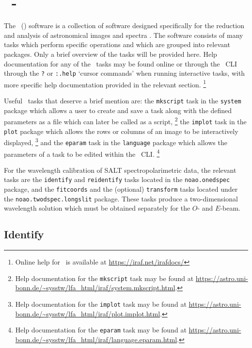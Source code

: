 \section[\textsc{iraf}]{\iraf\ - } \label{sec:iraf}

The \iraf\ () software is a collection of software designed specifically for the reduction and analysis of astronomical images and spectra \citep{iraf:1986, iraf:1993}. The software consists of many tasks which perform specific operations and which are grouped into relevant packages. Only a brief overview of the tasks will be provided here. Help documentation for any of the \iraf\ tasks may be found online or through the \iraf\ \gls{CLI} through the \texttt{?} or \texttt{:.help} `cursor commands' when running interactive tasks, with more specific help documentation provided in the relevant section.%
\footnote{Online help for \iraf\ is available at \url{https://iraf.net/irafdocs/}}

Useful \iraf\ tasks that deserve a brief mention are: the \texttt{mkscript} task in the \texttt{system} package which allows a user to create and save a task along with the defined parameters as a file which can later be called as a script,%
\footnote{Help documentation for the \texttt{mkscript} task may be found at \url{https://astro.uni-bonn.de/~sysstw/lfa_html/iraf/system.mkscript.html}.}
the \texttt{implot} task in the \texttt{plot} package which allows the rows or columns of an image to be interactively displayed,%
\footnote{Help documentation for the \texttt{implot} task may be found at \url{https://astro.uni-bonn.de/~sysstw/lfa_html/iraf/plot.implot.html}.}
and the \texttt{eparam} task in the \texttt{language} package which allows the parameters of a task to be edited within the \iraf\ \gls{CLI}.%
\footnote{Help documentation for the \texttt{eparam} task may be found at \url{https://astro.uni-bonn.de/~sysstw/lfa_html/iraf/language.eparam.html}.}

For the wavelength calibration of \gls{SALT} spectropolarimetric data, the relevant tasks are the \texttt{identify} and \texttt{reidentify} tasks located in the \texttt{noao.onedspec} package, and the \texttt{fitcoords} and the (optional) \texttt{transform} tasks located under the \texttt{noao.twodspec.long\-slit} package. These tasks produce a two-dimensional wavelength solution which must be obtained separately for the $O$- and $E$-beam.

\subsection{Identify} \label{subsec:iraf_identify}

